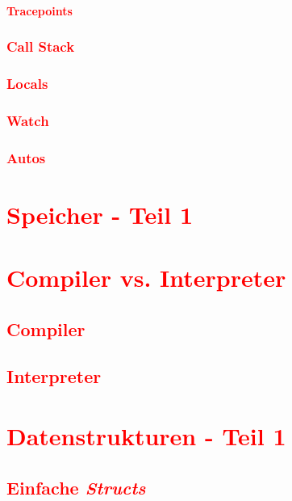 \subsubsection{\textcolor{red}{Tracepoints}}\label{sec:tracepoint}
\subsection{\textcolor{red}{Call Stack}}\label{sec:call-stack}
\subsection{\textcolor{red}{Locals}}\label{sec:locals}
\subsection{\textcolor{red}{Watch}}\label{sec:watch}
\subsection{\textcolor{red}{Autos}}\label{sec:autos}

\cleardoublepage\chapter{\textcolor{red}{Speicher - Teil 1}}\label{chap:memory-1}

\cleardoublepage\chapter{\textcolor{red}{Compiler vs. Interpreter}}\label{chap:compiler-vs-interpreter}
\section{\textcolor{red}{Compiler}}\label{sec:compiler}
\section{\textcolor{red}{Interpreter}}\label{sec:interpreter}

\cleardoublepage\chapter{\textcolor{red}{Datenstrukturen - Teil 1}}\label{chap:datastructures-1}
\section{\textcolor{red}{Einfache \textit{Structs}}}\label{sec:structs}
